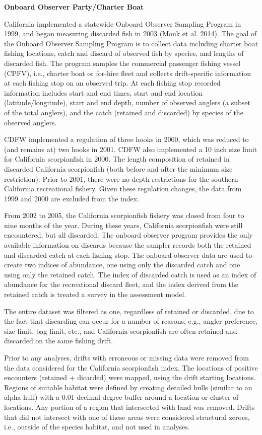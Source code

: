 \documentclass[12pt,]{article}
\begin{document}
\textbf{Onboard Observer Party/Charter Boat}

California implemented a statewide Onboard Observer Sampling Program in
1999, and began measuring discarded fish in 2003 (Monk et al.
\protect\hyperlink{ref-Monk2014}{2014}). The goal of the Onboard
Observer Sampling Program is to collect data including charter boat
fishing locations, catch and discard of observed fish by species, and
lengths of discarded fish. The program samples the commercial passenger
fishing vessel (CPFV), i.e., charter boat or for-hire fleet and collects
drift-specific information at each fishing stop on an observed trip. At
each fishing stop recorded information includes start and end times,
start and end location (latitude/longitude), start and end depth, number
of observed anglers (a subset of the total anglers), and the catch
(retained and discarded) by species of the observed anglers.

CDFW implemented a regulation of three hooks in 2000, which was reduced
to (and remains at) two hooks in 2001. CDFW also implemented a 10 inch
size limit for California scorpionfish in 2000. The length composition
of retained in discarded California scorpionfish (both before and after
the minimum size restriction). Prior to 2001, there were no depth
restrictions for the southern California recreational fishery. Given
these regulation changes, the data from 1999 and 2000 are excluded from
the index.

From 2002 to 2005, the California scorpionfish fishery was closed from
four to nine months of the year. During these years, California
scorpionfish were still encountered, but all discarded. The onboard
observer program provides the only available information on discards
because the sampler records both the retained and discarded catch at
each fishing stop. The onboard observer data are used to create two
indices of abundance, one using only the discarded catch and one using
only the retained catch. The index of discarded catch is used as an
index of abundance for the recreational discard fleet, and the index
derived from the retained catch is treated a survey in the assessment
model.

The entire dataset was filtered as one, regardless of retained or
discarded, due to the fact that discarding can occur for a number of
reasons, e.g., angler preference, size limit, bag limit, etc., and
California scorpionfish are often retained and discarded on the same
fishing drift.

Prior to any analyses, drifts with erroneous or missing data were
removed from the data considered for the California scorpionfish index.
The locations of positive encounters (retained + dicarded) were mapped,
using the drift starting locations. Regions of suitable habitat were
defined by creating detailed hulls (similar to an alpha hull) with a
0.01 decimal degree buffer around a location or cluster of locations.
Any portion of a region that intersected with land was removed. Drifts
that did not intersect with one of these areas were considered
structural zeroes, i.e., outside of the species habitat, and not used in
analyses.
\end{document}
